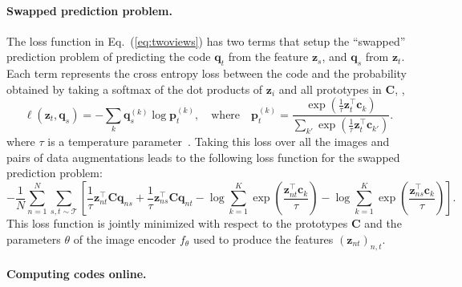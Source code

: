 \paragraph{Swapped prediction problem.} 
The loss function in Eq.~(\ref{eq:twoviews}) has two terms that setup the ``swapped'' prediction problem of predicting the code $\mathbf{q}_t$ from the feature $\mathbf{z}_s$, and $\mathbf{q}_s$ from $\mathbf{z}_t$. 
Each term represents the cross entropy loss between the code and the probability obtained by taking a softmax of the dot products of $\mathbf{z}_i$ and all prototypes in $\mathbf{C}$, \ie, 
\begin{equation}
  \ell(\mathbf{z}_t, \mathbf{q}_s) = - \sum_{k} \mathbf{q}_s^{(k)} \log \mathbf{p}_t^{(k)}, \quad \text{where} \quad \mathbf{p}_t^{(k)} = \frac{ \exp \left ( \frac{1}{\tau} \mathbf{z}_t^\top \mathbf{c}_k \right ) }{\sum_{k'} \exp \left ( \frac{1}{\tau} \mathbf{z}_t^\top \mathbf{c}_{k'} \right ) }.
  \label{eq:loss}
\end{equation}
where $\tau$ is a temperature parameter~\cite{wu2018unsupervised}.
Taking this loss over all the images and pairs of data augmentations leads to the following loss function for the swapped prediction problem:
\begin{equation}
  - \frac{1}{N} \sum_{n=1}^N \sum_{s,t \sim \mathcal{T}} \left [ 
  \frac{1}{\tau} \mathbf{z}_{nt}^\top \mathbf{C} \mathbf{q}_{ns}
  + \frac{1}{\tau} \mathbf{z}_{ns}^\top \mathbf{C} \mathbf{q}_{nt}
  - \log \sum_{k=1}^K \exp \left ( \frac{\mathbf{z}_{nt}^\top \mathbf{c}_k}{\tau} \right )  
  - \log \sum_{k=1}^K \exp \left ( \frac{\mathbf{z}_{ns}^\top \mathbf{c}_k}{\tau} \right ) \right ] .
  \nonumber
\label{eq:swapploss2}
\end{equation}
This loss function is jointly minimized with respect to the prototypes $\mathbf{C}$ and the parameters $\theta$ of the image encoder $f_\theta$ used to produce the features $(\mathbf{z}_{nt})_{n,t}$.

\paragraph{Computing codes online.}

